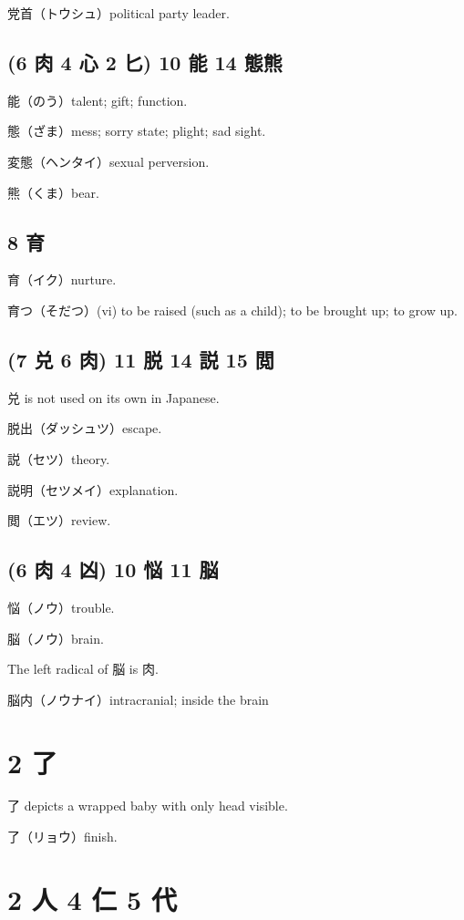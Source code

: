 党首（トウシュ）political party leader.

\subsection{(6 肉 4 心 2 匕) 10 能 14 態熊}

能（のう）talent; gift; function.

態（ざま）mess; sorry state; plight; sad sight.

変態（ヘンタイ）sexual perversion.

熊（くま）bear.

\subsection{8 育}

育（イク）nurture.

育つ（そだつ）(vi) to be raised (such as a child); to be brought up; to grow up.

\subsection{(7 兑 6 肉) 11 脱 14 説 15 閲}

兑 is not used on its own in Japanese.

脱出（ダッシュツ）escape.

説（セツ）theory.

説明（セツメイ）explanation.

閲（エツ）review.

\subsection{(6 肉 4 凶) 10 悩 11 脳}

悩（ノウ）trouble.

脳（ノウ）brain.

The left radical of 脳 is 肉.

脳内（ノウナイ）intracranial; inside the brain

\section{2 了}

了 depicts a wrapped baby with only head visible.

了（リョウ）finish.

\section{2 人 4 仁 5 代}

